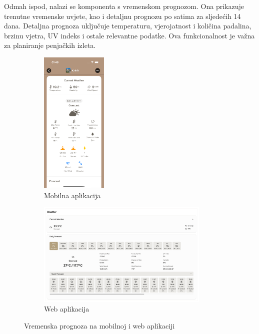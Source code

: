 Odmah ispod, nalazi se komponenta s vremenskom prognozom. Ona prikazuje trenutne vremenske uvjete, kao i detaljnu prognozu po satima za sljedećih 14 dana. Detaljna prognoza uključuje temperaturu, vjerojatnost i količina padalina, brzinu vjetra, UV indeks i ostale relevantne podatke. Ova funkcionalnost je važna za planiranje penjačkih izleta.

\begin{figure}[H]
    \centering
    \begin{subfigure}[b]{\textwidth}
        \centering
        \includegraphics[width=0.35\textwidth]{images/implementacija/crag-details/crag-weather-1.png}
        \caption{Mobilna aplikacija}
        \label{fig:vremenska_prognoza_mob}
    \end{subfigure}
    \hfill
    \begin{subfigure}[b]{\textwidth}
        \centering
        \includegraphics[width=0.9\textwidth]{images/implementacija/web/crag-details/crag-weather.png}
        \caption{Web aplikacija}
        \label{fig:vremenska_prognoza_web}
    \end{subfigure}
    \caption{Vremenska prognoza na mobilnoj i web aplikaciji}
    \label{fig:vremenska_prognoza}
\end{figure}



